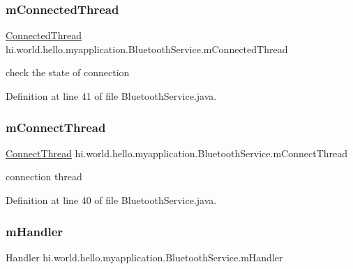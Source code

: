 \subsubsection{\texorpdfstring{mConnectedThread}{mConnectedThread}}
{\footnotesize\ttfamily \mbox{\hyperlink{classhi_1_1world_1_1hello_1_1myapplication_1_1_bluetooth_service_1_1_connected_thread}{Connected\+Thread}} hi.\+world.\+hello.\+myapplication.\+Bluetooth\+Service.\+m\+Connected\+Thread\hspace{0.3cm}{\ttfamily [private]}}



check the state of connection 



Definition at line 41 of file Bluetooth\+Service.\+java.

\mbox{\label{classhi_1_1world_1_1hello_1_1myapplication_1_1_bluetooth_service_aef012419760d62f7b8ebaa98229e1e4f}} 
\subsubsection{\texorpdfstring{mConnectThread}{mConnectThread}}
{\footnotesize\ttfamily \mbox{\hyperlink{classhi_1_1world_1_1hello_1_1myapplication_1_1_bluetooth_service_1_1_connect_thread}{Connect\+Thread}} hi.\+world.\+hello.\+myapplication.\+Bluetooth\+Service.\+m\+Connect\+Thread\hspace{0.3cm}{\ttfamily [private]}}



connection thread 



Definition at line 40 of file Bluetooth\+Service.\+java.

\mbox{\label{classhi_1_1world_1_1hello_1_1myapplication_1_1_bluetooth_service_af4425f6d4f4dce5f74d5d0b39c768f89}} 
\subsubsection{\texorpdfstring{mHandler}{mHandler}}
{\footnotesize\ttfamily Handler hi.\+world.\+hello.\+myapplication.\+Bluetooth\+Service.\+m\+Handler\hspace{0.3cm}{\ttfamily [private]}}



